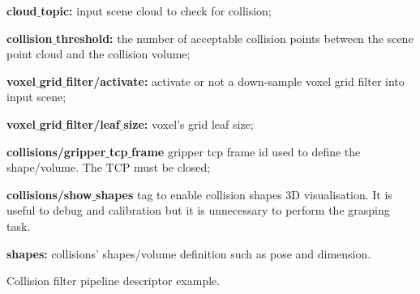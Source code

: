 \begin{itemize_jp}
    \item \textbf{cloud$\_$topic:} input scene cloud to check for collision;
    \item \textbf{collision$\_$threshold:} the number of acceptable collision points between the scene point cloud and the collision volume;
    \item \textbf{voxel$\_$grid$\_$filter/activate:} activate or not a down-sample voxel grid filter into input scene;
     \item \textbf{voxel$\_$grid$\_$filter/leaf$\_$size:} voxel's grid leaf size;
    \item \textbf{collisions/gripper$\_$tcp$\_$frame}  gripper tcp frame id used to define the shape/volume. The TCP must be closed;
    \item \textbf{collisions/show$\_$shapes} tag to enable collision shapes 3D visualisation. It is useful to debug and calibration but it is unnecessary to perform the grasping task.
    \item \textbf{shapes:} collisions' shapes/volume definition such as pose and dimension.

\end{itemize_jp}

\begin{snippet}[h!]
\centering
{}
\caption{Collision filter pipeline descriptor example.}
\label{code:collision_filter}
\end{snippet}


